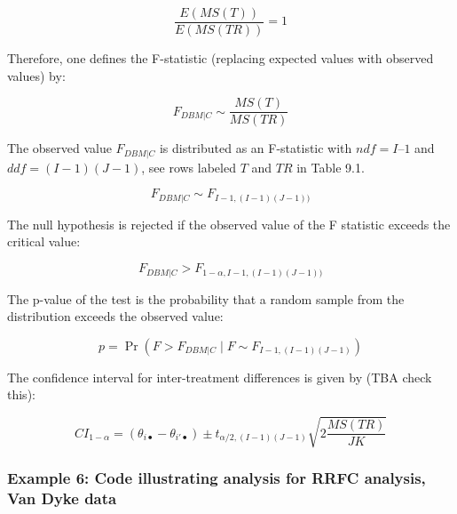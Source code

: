 \documentclass[
]{book}
\begin{document}
\begin{equation}
\frac{E(MS(T))}{E(MS(TR))}=1
\end{equation}

Therefore, one defines the F-statistic (replacing expected values with observed values) by:

\begin{equation}
F_{DBM|C} \sim \frac{MS(T)}{MS(TR)}
\label{eq:FStatRRFC}
\end{equation}

The observed value \(F_{DBM|C}\) is distributed as an F-statistic with \(ndf = I – 1\) and \(ddf = (I-1)(J-1)\), see rows labeled \(T\) and \(TR\) in Table 9.1.

\begin{equation}
F_{DBM|C} \sim F_{I-1,(I-1)(J-1))}
\label{eq:SamplingFStatRRFC}
\end{equation}

The null hypothesis is rejected if the observed value of the F statistic exceeds the critical value:

\begin{equation}
F_{DBM|C} > F_{1-\alpha,I-1,(I-1)(J-1))}
\label{eq:NhRejectRuleRRFC}
\end{equation}

The p-value of the test is the probability that a random sample from the distribution exceeds the observed value:

\begin{equation}
p=\Pr\left ( F>F_{DBM|C} \mid F \sim F_{I-1,(I-1)(J-1)} \right )
\label{eq:pRRFC}
\end{equation}

The confidence interval for inter-treatment differences is given by (TBA check this):

\begin{equation}
CI_{1-\alpha}=\left ( \theta_{i \bullet} - \theta_{i' \bullet} \right ) \pm t_{\alpha/2,(I-1)(J-1)}\sqrt{2\frac{MS(TR)}{JK}}
\label{eq:confIntervalRRFC}
\end{equation}

\hypertarget{example-6-code-illustrating-analysis-for-rrfc-analysis-van-dyke-data}{%
\subsubsection{Example 6: Code illustrating analysis for RRFC analysis, Van Dyke data}\label{example-6-code-illustrating-analysis-for-rrfc-analysis-van-dyke-data}}
\end{document}
